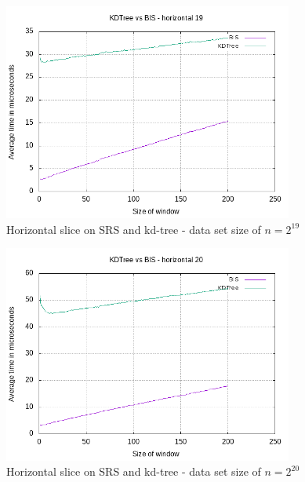 \begin{figure}[h]
    \centering
    \includegraphics[width = 0.85\textwidth]{pictures/analysis/smalls/hori_19.png}
    \caption{Horizontal slice on SRS and kd-tree - data set size of $n=2^{19}$}\label{fig:small_hori_19}
\end{figure}

\begin{figure}[h]
    \centering
    \includegraphics[width = 0.85\textwidth]{pictures/analysis/smalls/hori_20.png}
    \caption{Horizontal slice on SRS and kd-tree - data set size of $n=2^{20}$}\label{fig:small_hori_20}
\end{figure}

